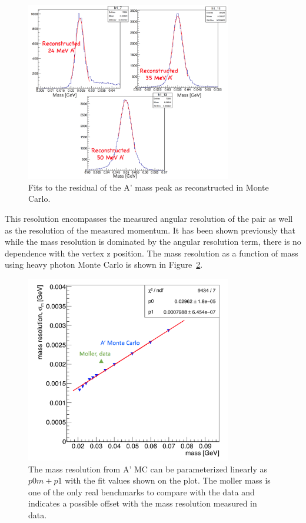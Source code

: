 \begin{figure}[H]
  \centering
     \includegraphics[width=0.8\textwidth]{plots/L1L1MassFit.png}
  \caption{Fits to the residual of the A' mass peak as reconstructed in Monte Carlo.}
  \label{fig:l1l1_mfits}
\end{figure} 

This resolution encompasses the measured angular resolution of the pair as well as the resolution of the measured momentum. It has been shown previously that while the mass resolution is dominated by the angular resolution term, there is no dependence with the vertex z position. The mass resolution as a function of mass using heavy photon Monte Carlo is shown in Figure~\ref{fig:massRes_L1L1}.


\begin{figure}[H]
  \centering
     \includegraphics[width=0.8\textwidth]{plots/massRes_L1L1.png}
  \caption{The mass resolution from A' MC can be parameterized linearly as $p0m+p1$ with the fit values shown on the plot. The moller mass is one of the only real benchmarks to compare with the data and indicates a possible offset with the mass resolution measured in data. }
  \label{fig:massRes_L1L1}
\end{figure} 

